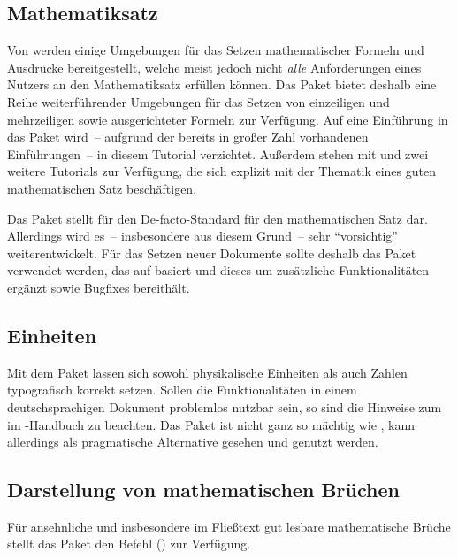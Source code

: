 \documentclass[%
  english,ngerman,%
  cdgeometry=no,DIV=12,automark,%
]{tudscrartcl}
\begin{document}
\subsection{Mathematiksatz}
Von  werden einige Umgebungen für das Setzen mathematischer 
Formeln und Ausdrücke bereitgestellt, welche meist jedoch nicht \emph{alle} 
Anforderungen eines Nutzers an den Mathematiksatz erfüllen können. Das Paket
 bietet deshalb eine Reihe weiterführender Umgebungen für das 
Setzen von einzeiligen und mehrzeiligen sowie ausgerichteter Formeln zur 
Verfügung. Auf eine Einführung in das Paket wird~-- aufgrund der bereits in 
großer Zahl vorhandenen Einführungen~-- in diesem Tutorial verzichtet. Außerdem 
stehen mit  und  zwei weitere Tutorials 
zur Verfügung, die sich explizit mit der Thematik eines guten mathematischen 
Satz beschäftigen.

Das Paket  stellt für  den De-facto-Standard 
für den mathematischen Satz dar. Allerdings wird es~-- insbesondere aus diesem 
Grund~-- sehr \enquote{vorsichtig} weiterentwickelt. Für das Setzen neuer 
Dokumente sollte deshalb das Paket  verwendet werden, das
auf  basiert und dieses um zusätzliche Funktionalitäten 
ergänzt sowie Bugfixes bereithält.


\subsection{Einheiten}
Mit dem Paket  lassen sich sowohl physikalische Einheiten als 
auch Zahlen typografisch korrekt setzen. Sollen die Funktionalitäten in einem 
deutschsprachigen Dokument problemlos nutzbar sein, so sind die Hinweise zum 
 im 
\TUDScript-Handbuch zu beachten. Das Paket  ist nicht ganz so 
mächtig wie , kann allerdings als pragmatische Alternative 
gesehen und genutzt werden.


\subsection{Darstellung von mathematischen Brüchen}
Für ansehnliche und insbesondere im Fließtext gut lesbare mathematische Brüche 
stellt das Paket  den Befehl () zur 
Verfügung.
%
\begin{Preamble}
\usepackage{xfrac}

\end{Preamble}
\end{document}
